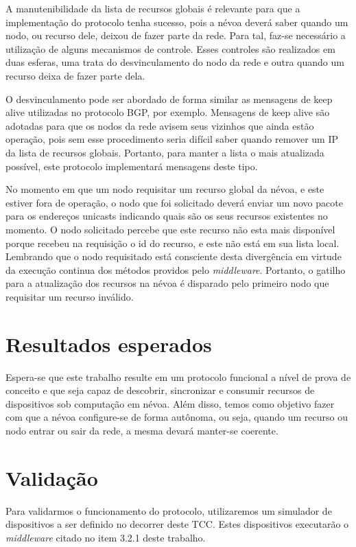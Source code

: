 A manutenibilidade da lista de recursos globais é relevante para que a implementação do protocolo tenha sucesso, pois a névoa deverá saber quando um nodo, ou recurso dele, deixou de fazer parte da rede.
Para tal, faz-se necessário a utilização de alguns mecanismos de controle.
Esses controles são realizados em duas esferas, uma trata do desvinculamento do nodo da rede e outra quando um recurso deixa de fazer parte dela.

O desvinculamento pode ser abordado de forma similar as mensagens de keep alive utilizadas no protocolo BGP, por exemplo.
Mensagens de keep alive são adotadas para que os nodos da rede avisem seus vizinhos que ainda estão operação, pois sem esse procedimento seria difícil
saber quando remover um IP da lista de recursos globais. Portanto, para manter a lista o mais atualizada possível, este protocolo implementará mensagens deste tipo.

No momento em que um nodo requisitar um recurso global da névoa, e este estiver fora de operação, o nodo que foi solicitado deverá enviar um novo pacote para os endereços unicasts indicando quais são os seus recursos existentes no momento.
O nodo solicitado percebe que este recurso não esta mais disponível porque recebeu na requisição o id do recurso, e este não está em sua lista local.
Lembrando que o nodo requisitado está consciente desta divergência em virtude da execução continua dos métodos providos pelo \textit{middleware}. Portanto, o gatilho para a atualização dos recursos na névoa
é disparado pelo primeiro nodo que requisitar um recurso inválido.


\section{Resultados esperados}

Espera-se que este trabalho resulte em um protocolo funcional a nível de prova de conceito e que seja capaz de descobrir, sincronizar e consumir recursos de dispositivos sob computação em névoa.
Além disso, temos como objetivo fazer com que a névoa configure-se de forma autônoma, ou seja, quando um recurso ou nodo entrar ou sair da rede, a mesma devará manter-se coerente.


\section{Validação}

Para validarmos o funcionamento do protocolo, utilizaremos um simulador de dispositivos a ser definido no decorrer deste TCC.
Estes dispositivos executarão o \textit{middleware} citado no item 3.2.1 deste trabalho.

